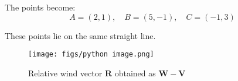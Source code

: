 \documentclass[journal]{IEEEtran}
\begin{document}
The points become:
\[
A = (2, 1), \quad B = (5, -1), \quad C = (-1, 3)
\]

These points lie on the same straight line.









\begin{figure}[htbp]
\centering
\texttt{[image: figs/python image.png]} 
\caption{Relative wind vector $\mathbf{R}$ obtained as $\mathbf{W}-\mathbf{V}$}
\label{fig:wind}
\end{figure}
\end{document}
